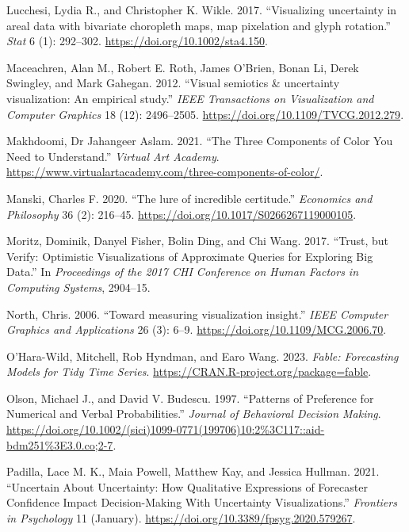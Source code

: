 \documentclass[
  letterpaper,
  DIV=11,
  numbers=noendperiod]{scrartcl}
\newlength{\cslhangindent}
\newlength{\cslentryspacingunit} %
\newenvironment{CSLReferences}[2] %
 {%
  \setlength{\parindent}{0pt}
  \ifodd #1
  \let\oldpar\par
  \def\par{\hangindent=\cslhangindent\oldpar}
  \fi
  \setlength{\parskip}{#2\cslentryspacingunit}
 }%
 {}
\begin{document}
\begin{CSLReferences}{1}{0}
\leavevmode{}%
Lucchesi, Lydia R., and Christopher K. Wikle. 2017. {``{Visualizing
uncertainty in areal data with bivariate choropleth maps, map pixelation
and glyph rotation}.''} \emph{Stat} 6 (1): 292--302.
\url{https://doi.org/10.1002/sta4.150}.

\leavevmode{}%
Maceachren, Alan M., Robert E. Roth, James O'Brien, Bonan Li, Derek
Swingley, and Mark Gahegan. 2012. {``{Visual semiotics \& uncertainty
visualization: An empirical study}.''} \emph{IEEE Transactions on
Visualization and Computer Graphics} 18 (12): 2496--2505.
\url{https://doi.org/10.1109/TVCG.2012.279}.

\leavevmode{}%
Makhdoomi, Dr Jahangeer Aslam. 2021. {``The Three Components of Color
You Need to Understand.''} \emph{Virtual Art Academy}.
\url{https://www.virtualartacademy.com/three-components-of-color/}.

\leavevmode{}%
Manski, Charles F. 2020. {``{The lure of incredible certitude}.''}
\emph{Economics and Philosophy} 36 (2): 216--45.
\url{https://doi.org/10.1017/S0266267119000105}.

\leavevmode{}%
Moritz, Dominik, Danyel Fisher, Bolin Ding, and Chi Wang. 2017.
{``Trust, but Verify: Optimistic Visualizations of Approximate Queries
for Exploring Big Data.''} In \emph{Proceedings of the 2017 CHI
Conference on Human Factors in Computing Systems}, 2904--15.

\leavevmode{}%
North, Chris. 2006. {``{Toward measuring visualization insight}.''}
\emph{IEEE Computer Graphics and Applications} 26 (3): 6--9.
\url{https://doi.org/10.1109/MCG.2006.70}.

\leavevmode{}%
O'Hara-Wild, Mitchell, Rob Hyndman, and Earo Wang. 2023. \emph{Fable:
Forecasting Models for Tidy Time Series}.
\url{https://CRAN.R-project.org/package=fable}.

\leavevmode{}%
Olson, Michael J., and David V. Budescu. 1997. {``Patterns of Preference
for Numerical and Verbal Probabilities.''} \emph{Journal of Behavioral
Decision Making}.
\url{https://doi.org/10.1002/(sici)1099-0771(199706)10:2\%3C117::aid-bdm251\%3E3.0.co;2-7}.

\leavevmode{}%
Padilla, Lace M. K., Maia Powell, Matthew Kay, and Jessica Hullman.
2021. {``{Uncertain About Uncertainty: How Qualitative Expressions of
Forecaster Confidence Impact Decision-Making With Uncertainty
Visualizations}.''} \emph{Frontiers in Psychology} 11 (January).
\url{https://doi.org/10.3389/fpsyg.2020.579267}.


\end{CSLReferences}
\end{document}
